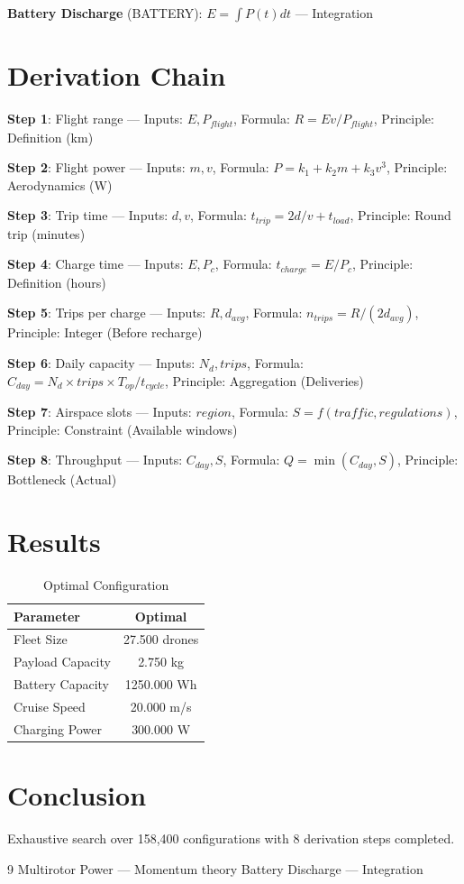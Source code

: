 \documentclass[11pt,twocolumn]{article}
\begin{document}
\textbf{Battery Discharge} (BATTERY): $E = \int P(t) dt$ --- Integration


\section{Derivation Chain}
\textbf{Step 1}: Flight range --- Inputs: $E, P_{flight}$, Formula: $R = E v / P_{flight}$, Principle: Definition (km)


\textbf{Step 2}: Flight power --- Inputs: $m, v$, Formula: $P = k_1 + k_2 m + k_3 v^3$, Principle: Aerodynamics (W)


\textbf{Step 3}: Trip time --- Inputs: $d, v$, Formula: $t_{trip} = 2d/v + t_{load}$, Principle: Round trip (minutes)


\textbf{Step 4}: Charge time --- Inputs: $E, P_c$, Formula: $t_{charge} = E / P_c$, Principle: Definition (hours)


\textbf{Step 5}: Trips per charge --- Inputs: $R, d_{avg}$, Formula: $n_{trips} = R / (2 d_{avg})$, Principle: Integer (Before recharge)


\textbf{Step 6}: Daily capacity --- Inputs: $N_d, trips$, Formula: $C_{day} = N_d \times trips \times T_{op}/t_{cycle}$, Principle: Aggregation (Deliveries)


\textbf{Step 7}: Airspace slots --- Inputs: $region$, Formula: $S = f(traffic, regulations)$, Principle: Constraint (Available windows)


\textbf{Step 8}: Throughput --- Inputs: $C_{day}, S$, Formula: $Q = \min(C_{day}, S)$, Principle: Bottleneck (Actual)


\section{Results}
\begin{table}[h]
\centering
\caption{Optimal Configuration}
\begin{tabular}{@{}lc@{}}
\toprule
Parameter & Optimal \\
\midrule
Fleet Size & 27.500 drones \\
Payload Capacity & 2.750 kg \\
Battery Capacity & 1250.000 Wh \\
Cruise Speed & 20.000 m/s \\
Charging Power & 300.000 W \\
\bottomrule
\end{tabular}
\end{table}

\section{Conclusion}
Exhaustive search over 158,400 configurations with 8 derivation steps completed.

\begin{thebibliography}{9}
 Multirotor Power --- Momentum theory
 Battery Discharge --- Integration
\end{thebibliography}
\end{document}
